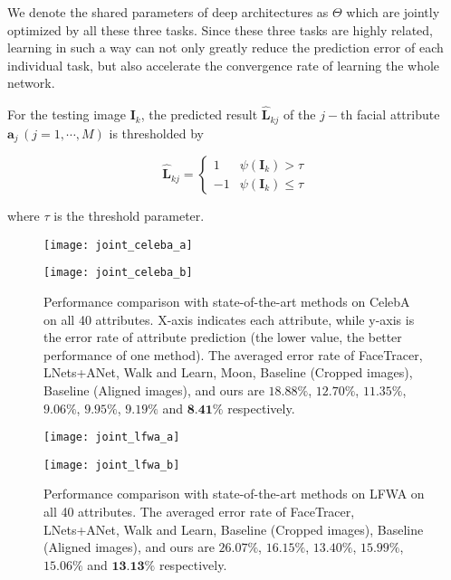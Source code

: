 \documentclass[10pt,twocolumn,letterpaper]{article}
\begin{document}
\noindent We denote the shared parameters of deep architectures as
$\Theta$ which are jointly optimized by all these three tasks. Since
these three tasks are highly related, learning in such a way can not
only greatly reduce the prediction error of each individual task,
but also accelerate the convergence rate of learning the whole network.

For the testing image $\mathbf{I}_{k}$, the predicted result $\hat{\mathbf{L}}_{kj}$
of the $j-$th facial attribute $\mathbf{a}_{j}\,(j=1,\cdots,M)$
is thresholded by

\begin{equation}
\hat{\mathbf{L}}_{kj}=\begin{cases}
1 & \psi\left(\mathbf{I}_{k}\right)>\tau\\
-1 & \psi\left(\mathbf{I}_{k}\right)\leq\tau
\end{cases}\label{eq:threshold}
\end{equation}

\noindent where $\tau$ is the threshold parameter.

\begin{figure*}
\begin{centering}
\texttt{[image: joint\_celeba\_a]} 
\par\end{centering}
\begin{centering}
\texttt{[image: joint\_celeba\_b]} 
\par\end{centering}
\caption{Performance comparison with state-of-the-art methods on CelebA on
all 40 attributes. X-axis indicates each attribute, while y-axis is
the error rate of attribute prediction (the lower value, the better
performance of one method). The averaged error rate of FaceTracer,
LNets+ANet, Walk and Learn, Moon, Baseline (Cropped images), Baseline
(Aligned images), and ours are $18.88\%$, $12.70\%$, $11.35\%$,
$9.06\%$, $9.95\%$, $9.19\%$ and $\textbf{8.41\%}$ respectively.
\label{fig:celebA-Performance-comparison-with}}
\end{figure*}

\begin{figure*}
\begin{centering}
\texttt{[image: joint\_lfwa\_a]} 
\par\end{centering}
\begin{centering}
\texttt{[image: joint\_lfwa\_b]} 
\par\end{centering}
\caption{Performance comparison with state-of-the-art methods on LFWA on all
40 attributes. The averaged error rate of FaceTracer, LNets+ANet, Walk
and Learn, Baseline (Cropped images), Baseline (Aligned images), and
ours are $26.07\%$, $16.15\%$, $13.40\%$, $15.99\%$, $15.06\%$
and  $\textbf{13.13\%}$ respectively. \label{fig:Performance-comparison-lfwa}}
\end{figure*}
\end{document}
